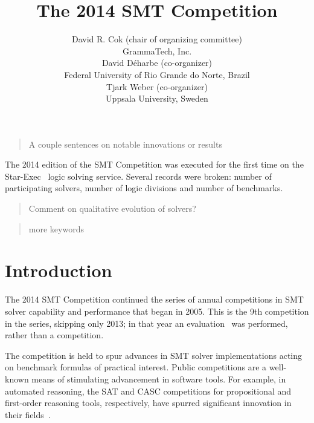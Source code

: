 \documentclass[twosize,11pt]{article}
\newcommand{\comment}[2]{\begin{quote}\sc #1\marginpar{\textcolor{red}{$\ast^{\mbox{#2}}$}}\end{quote}}
\newcommand{\davidd}[1]{\comment{#1}{DD}}
\newcommand{\davidc}[1]{\comment{#1}{DC}}
\begin{document}
\title{The 2014 SMT Competition}

\author{
\name David R. Cok (chair of organizing committee)
 \\
\addr GrammaTech, Inc. \\
\AND
\name David D\'{e}harbe (co-organizer)
 \\
\addr Federal University of Rio Grande do Norte, Brazil \\ 
\AND
\name Tjark Weber (co-organizer) \\
\addr Uppsala University, Sweden
}

\maketitle

\davidc{A couple sentences on notable innovations or results}
The 2014 edition of the SMT Competition was executed for the first time on the Star-Exec~\cite{DBLP:conf/cade/StumpST14} logic solving service. Several records were broken: number of participating solvers, number of logic divisions and number of benchmarks.

\davidd{Comment on qualitative evolution of solvers?}
 \davidc{more keywords}


\section{Introduction}
\label{sec:intro}

The 2014 SMT Competition continued the series of annual competitions in SMT solver capability and performance that began in 2005. This is the 9th competition in the series, skipping only 2013; in that year an evaluation~\cite{it:2014-017} was performed, rather than a competition.

The competition is held to spur advances in
SMT solver implementations acting on benchmark formulas of practical interest. Public competitions are
a well-known means of stimulating advancement in software tools. For example, in automated
reasoning, the SAT and CASC competitions for propositional and first-order reasoning tools, respectively,
have spurred significant innovation in their fields~\cite{leberre+03,PSS02}.
\end{document}
